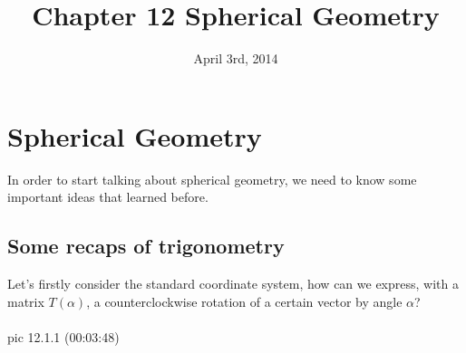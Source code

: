 \documentclass{article}
\title{Chapter 12 Spherical Geometry}
\date{April 3rd, 2014}
\begin{document}
\maketitle



\section{Spherical Geometry}
In order to start talking about spherical geometry, we need to know some important ideas that learned before.

\subsection{Some recaps of trigonometry}

Let's firstly consider the standard coordinate system, how can we express, with a matrix $ T(\alpha) $, a counterclockwise rotation of a certain vector by angle $ \alpha $? \\\\

pic 12.1.1 (00:03:48)
\end{document}
